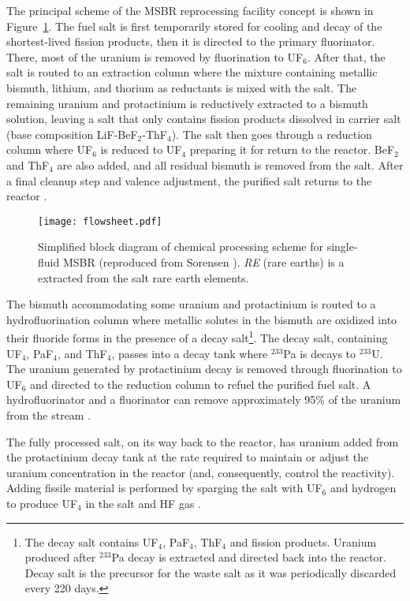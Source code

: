 The principal scheme of the \gls{MSBR} reprocessing facility concept is shown 
in Figure~\ref{fig:material_flow}. The fuel salt is first temporarily stored 
for cooling and decay of the shortest-lived fission products, then it is 
directed to the primary fluorinator. There, most of the uranium is removed by 
fluorination to UF$_6$. After that, the salt is routed to an extraction column 
where the mixture containing metallic bismuth, lithium, and thorium as 
reductants is mixed with the salt. The remaining uranium and protactinium is  
reductively extracted to a bismuth solution, leaving a salt that only contains 
fission products dissolved in carrier salt (base composition 
LiF-BeF$_2$-ThF$_4$). The salt then goes through a reduction column where 
UF$_6$ is reduced to UF$_4$ preparing it for return to the reactor. BeF$_2$ 
and ThF$_4$ are also added, and all residual bismuth is removed from the salt. 
After a final cleanup step and valence adjustment, the purified salt returns 
to the reactor \cite{carter_design_1972, 
sorensen_one-fluid_2006}.
\begin{figure}[htp!] %
  \centering
  \texttt{[image: flowsheet.pdf]}
  \caption{Simplified block diagram of chemical processing scheme for 
  single-fluid \gls{MSBR} (reproduced from Sorensen 
  \cite{sorensen_one-fluid_2006}). \emph{RE} (rare earths) is a extracted from 
  the salt rare earth elements.}
  \label{fig:material_flow}
\end{figure}

The bismuth accommodating some uranium and protactinium is routed to a 
hydrofluorination column where metallic solutes in the bismuth are oxidized 
into their fluoride forms in the presence of a decay salt\footnote{The decay 
salt contains UF$_4$, PaF$_4$, ThF$_4$ and fission products. Uranium produced 
after $^{233}$Pa decay is extracted and directed back into the reactor. Decay 
salt is the precursor for the waste salt as it was periodically discarded 
every 220 days.}. The decay salt, containing UF$_4$, PaF$_4$, and ThF$_4$, 
passes into a decay tank where $^{233}$Pa is decays to $^{233}$U. The uranium 
generated by protactinium decay is removed through fluorination to UF$_6$ and 
directed to the reduction column to refuel the purified fuel salt. A  
hydrofluorinator and a fluorinator can remove approximately 95\% of the 
uranium from the stream \cite{robertson_conceptual_1971}.

The fully processed salt, on its way back to the reactor, has uranium added 
from the protactinium decay tank at the rate required to maintain or adjust 
the uranium concentration in the reactor (and, consequently, control the 
reactivity). Adding fissile material is performed by sparging the salt with 
UF$_6$ and hydrogen to produce UF$_4$ in the salt and HF gas 
\cite{robertson_conceptual_1971}.

